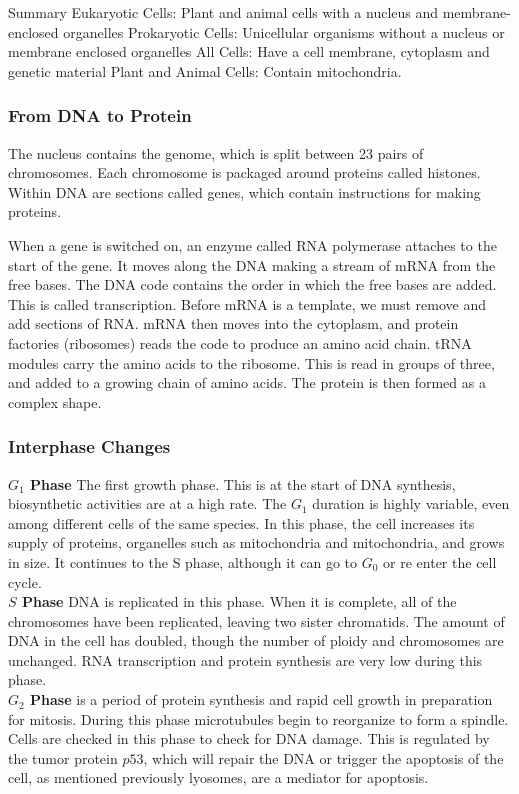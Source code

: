Summary
Eukaryotic Cells: Plant and animal cells with a nucleus and membrane-enclosed organelles
Prokaryotic Cells: Unicellular organisms without a nucleus or membrane enclosed organelles
All Cells: Have a cell membrane, cytoplasm and genetic material
Plant and Animal Cells: Contain mitochondria.

\subsubsection{From DNA to Protein}

The nucleus contains the genome, which is split between 23 pairs of chromosomes. Each chromosome is packaged around proteins called histones. Within DNA are sections called genes, which contain instructions for making proteins. 

When a gene is switched on, an enzyme called RNA polymerase attaches to the start of the gene. It moves along the DNA making a stream of mRNA from the free bases. The DNA code contains the order in which the free bases are added. This is called transcription. Before mRNA is a template, we must remove and add sections of RNA. mRNA then moves into the cytoplasm, and protein factories (ribosomes) reads the code to produce an amino acid chain. tRNA modules carry the amino acids to the ribosome. This is read in groups of three, and added to a growing chain of amino acids. The protein is then formed as a complex shape.

\subsubsection{Interphase Changes}

\textbf{$G_1$ Phase} The first growth phase. This is at the start of DNA synthesis, biosynthetic activities are at a high rate. The $G_1$ duration is highly variable, even among different cells of the same species. In this phase, the cell increases its supply of proteins, organelles such as mitochondria and mitochondria, and grows in size. It continues to the S phase, although it can go to $G_0$ or re enter the cell cycle.
\\

\noindent\textbf{$S$ Phase} DNA is replicated in this phase. When it is complete, all of the chromosomes have been replicated, leaving two sister chromatids. The amount of DNA in the cell has doubled, though the number of ploidy and chromosomes are unchanged. RNA transcription and protein synthesis are very low during this phase.
\\

\noindent\textbf{$G_2$ Phase} is a period of protein synthesis and rapid cell growth in preparation for mitosis. During this phase microtubules begin to reorganize to form a spindle. Cells are checked in this phase to check for DNA damage. This is regulated by the tumor protein $p53$, which will repair the DNA or trigger the apoptosis of the cell, as mentioned previously lyosomes, are a mediator for apoptosis.




